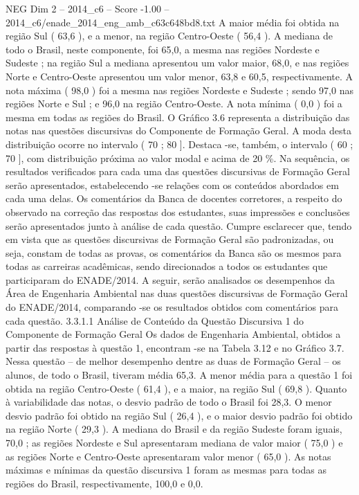 \begin{textsample}{NEG Dim 2 – 2014\_c6 – Score -1.00 – 2014\_c6/enade\_2014\_eng\_amb\_c63c648bd8.txt}
A maior média foi obtida na região Sul ( 63,6 ), e a menor, na região Centro-Oeste ( 56,4 ).
A mediana de todo o Brasil, neste componente, foi 65,0, a mesma nas regiões Nordeste e Sudeste ; na região Sul a mediana apresentou um valor maior, 68,0, e nas regiões Norte e Centro-Oeste apresentou um valor menor, 63,8 e 60,5, respectivamente.
A nota máxima ( 98,0 ) foi a mesma nas regiões Nordeste e Sudeste ; sendo 97,0 nas regiões Norte e Sul ; e 96,0 na região Centro-Oeste.
A nota mínima ( 0,0 ) foi a mesma em todas as regiões do Brasil.
O Gráfico 3.6 representa a distribuição das notas nas questões discursivas do Componente de Formação Geral.
A moda desta distribuição ocorre no intervalo ( 70 ; 80 ].
Destaca -se, também, o intervalo ( 60 ; 70 ], com distribuição próxima ao valor modal e acima de 20 \%.
Na sequência, os resultados verificados para cada uma das questões discursivas de Formação Geral serão apresentados, estabelecendo -se relações com os conteúdos abordados em cada uma delas.
Os comentários da Banca de docentes corretores, a respeito do observado na correção das respostas dos estudantes, suas impressões e conclusões serão apresentados junto à análise de cada questão.
Cumpre esclarecer que, tendo em vista que as questões discursivas de Formação Geral são padronizadas, ou seja, constam de todas as provas, os comentários da Banca são os mesmos para todas as carreiras acadêmicas, sendo direcionados a todos os estudantes que participaram do ENADE/2014.
A seguir, serão analisados os desempenhos da Área de Engenharia Ambiental nas duas questões discursivas de Formação Geral do ENADE/2014, comparando -se os resultados obtidos com comentários para cada questão. 3.3.1.1 Análise de Conteúdo da Questão Discursiva 1 do Componente de Formação Geral Os dados de Engenharia Ambiental, obtidos a partir das respostas à questão 1, encontram -se na Tabela 3.12 e no Gráfico 3.7.
Nessa questão – de melhor desempenho dentre as duas de Formação Geral – os alunos, de todo o Brasil, tiveram média 65,3.
A menor média para a questão 1 foi obtida na região Centro-Oeste ( 61,4 ), e a maior, na região Sul ( 69,8 ).
Quanto à variabilidade das notas, o desvio padrão de todo o Brasil foi 28,3.
O menor desvio padrão foi obtido na região Sul ( 26,4 ), e o maior desvio padrão foi obtido na região Norte ( 29,3 ).
A mediana do Brasil e da região Sudeste foram iguais, 70,0 ; as regiões Nordeste e Sul apresentaram mediana de valor maior ( 75,0 ) e as regiões Norte e Centro-Oeste apresentaram valor menor ( 65,0 ).
As notas máximas e mínimas da questão discursiva 1 foram as mesmas para todas as regiões do Brasil, respectivamente, 100,0 e 0,0.

\end{textsample}
